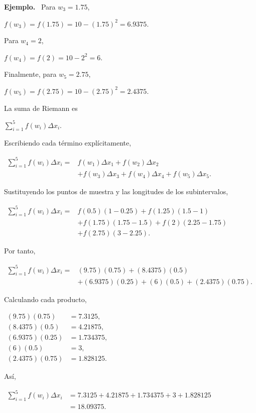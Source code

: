 \documentclass[12pt]{article}
\newenvironment{Ejem}
{\par\medskip\noindent\textbf{Ejemplo.}\ }
{\par\medskip}
\begin{document}
\begin{Ejem}
Para $w_3=1.75$,

$
f(w_3)
=
f(1.75)
=
10-(1.75)^2
=
6.9375.
$

Para $w_4=2$,

$
f(w_4)
=
f(2)
=
10-2^2
=
6.
$

Finalmente, para $w_5=2.75$,

$
f(w_5)
=
f(2.75)
=
10-(2.75)^2
=
2.4375.
$

La suma de Riemann es

$
\sum_{i=1}^{5}f(w_i)\Delta x_i.
$

Escribiendo cada término explícitamente,

$
\begin{aligned}
\sum_{i=1}^{5}f(w_i)\Delta x_i
={}&
f(w_1)\Delta x_1
+
f(w_2)\Delta x_2\\
&+
f(w_3)\Delta x_3
+
f(w_4)\Delta x_4
+
f(w_5)\Delta x_5.
\end{aligned}
$

Sustituyendo los puntos de muestra y las longitudes de los
subintervalos,

$
\begin{aligned}
\sum_{i=1}^{5}f(w_i)\Delta x_i
={}&
f(0.5)(1-0.25)
+
f(1.25)(1.5-1)\\
&+
f(1.75)(1.75-1.5)
+
f(2)(2.25-1.75)\\
&+
f(2.75)(3-2.25).
\end{aligned}
$

Por tanto,

$
\begin{aligned}
\sum_{i=1}^{5}f(w_i)\Delta x_i
={}&
(9.75)(0.75)
+
(8.4375)(0.5)\\
&+
(6.9375)(0.25)
+
(6)(0.5)
+
(2.4375)(0.75).
\end{aligned}
$

Calculando cada producto,

$
\begin{aligned}
(9.75)(0.75)&=7.3125,\\
(8.4375)(0.5)&=4.21875,\\
(6.9375)(0.25)&=1.734375,\\
(6)(0.5)&=3,\\
(2.4375)(0.75)&=1.828125.
\end{aligned}
$

Así,

$
\begin{aligned}
\sum_{i=1}^{5}f(w_i)\Delta x_i
&=
7.3125
+4.21875
+1.734375
+3
+1.828125\\
&=
\boxed{18.09375}.
\end{aligned}
$


\end{Ejem}
\end{document}
